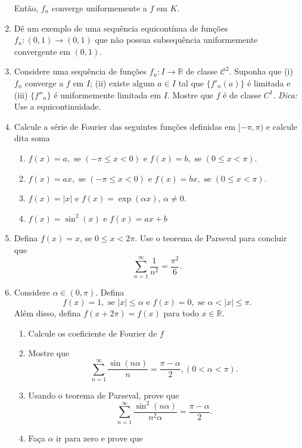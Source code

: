 \documentclass{article}
\begin{document}
\begin{enumerate}
      Então, $f_{n}$ converge uniformemente a $f$ em $K$.
      \item Dê um exemplo de uma sequência 
      equicontínua de funções 
      $f_{n}:(0,1)\rightarrow (0,1)$ que não possua subsequência 
      uniformemente convergente em $(0,1)$.       
      \item Considere uma sequência de funções 
      $f_{n}:I \rightarrow \mathbb{R}$ de 
      classe $\mathcal{C}^2$.
      Suponha que (i) $f_{n}$ converge a $f$ em $I$; 
      (ii) existe algum $a \in I$ tal que $\{f'_{n}(a)\}$
      é limitada e (iii) $\{f''_{n}\}$ é uniformemente limitada em $I$. Mostre que $f$ é de classe $C^1$. 
      {\it Dica: } Use a equicontinuidade. 
      \item Calcule a série de Fourier das seguintes funções definidas em $[-\pi, \pi)$ e calcule dita soma      
         \begin{enumerate}
         \item $f(x)=a, 
         \text{ se }(-\pi\leq x<0) \text{ e } f(x)=b,
         \text{ se } (0\leq x<\pi)$.
         \item $f(x)=ax, 
         \text{ se }(-\pi\leq x<0) \text{ e } 
         f(x)=bx, \text{ se } (0\leq x<\pi)$.
          \item $f(x)=|x|$ e 
          $f(x)=\exp(\alpha x)$, $\alpha \neq 0$.
         \item $f(x)=\sin^2(x)$ e $f(x)=ax+b$ 
         \end{enumerate}            
      \item Defina $f(x)=x$, se $0\leq x <2\pi$. Use o teorema de Parseval para concluir que 
      $$  \sum_{n=1}^{\infty} \frac{1}{n^2}= \frac{\pi^2}{6}.$$      
      \item Considere $\alpha \in (0, \pi)$. 
      Defina 
      $$f(x)=1, \text{ se } |x|\leq \alpha \text{ e } 
        f(x)=0, \text{ se } \alpha< |x|\leq \pi.$$
      Além disso, defina $f(x+2\pi)=f(x)$ para todo 
      $x \in \mathbb{R}$. 
        \begin{enumerate}
        \item Calcule os coeficiente de Fourier de $f$
        \item Mostre que 
        $$  \sum_{n=1}^{\infty} \frac{\sin(n\alpha)}{n}=\frac{\pi-\alpha}{2}, (0 < \alpha < \pi). $$
        \item Usando o teorema de Parseval, prove que 
        $$ \sum_{n=1}^{\infty} \frac{\sin^{2}(n\alpha)}{n^2 \alpha}=\frac{\pi-\alpha}{2}. $$
        \item Faça $\alpha$ ir para zero e prove que 

\end{enumerate}
\end{enumerate}
\end{document}
